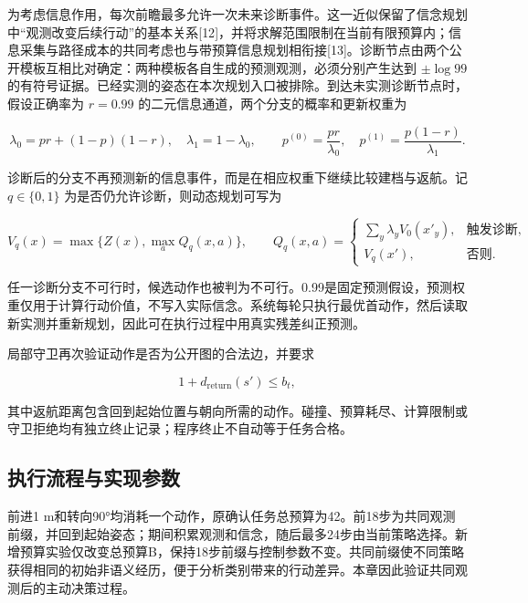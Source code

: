 \documentclass[11pt,a4paper]{article}
\begin{document}
为考虑信息作用，每次前瞻最多允许一次未来诊断事件。这一近似保留了信念规划中``观测改变后续行动''的基本关系{[}12{]}，并将求解范围限制在当前有限预算内；信息采集与路径成本的共同考虑也与带预算信息规划相衔接{[}13{]}。诊断节点由两个公开模板互相比对确定：两种模板各自生成的预测观测，必须分别产生达到 \(\pm\log99\) 的有符号证据。已经实测的姿态在本次规划入口被排除。到达未实测诊断节点时，假设正确率为 \(r=0.99\) 的二元信息通道，两个分支的概率和更新权重为

\[
\lambda_0=pr+(1-p)(1-r),\quad \lambda_1=1-\lambda_0,
\qquad p^{(0)}=\frac{pr}{\lambda_0},\quad
p^{(1)}=\frac{p(1-r)}{\lambda_1}.
\]

诊断后的分支不再预测新的信息事件，而是在相应权重下继续比较建档与返航。记 \(q\in\{0,1\}\) 为是否仍允许诊断，则动态规划可写为

\[
V_q(x)=\max\{Z(x),\max_a Q_q(x,a)\},\qquad
Q_q(x,a)=
\begin{cases}
\sum_y\lambda_yV_0(x'_{y}),&\text{触发诊断},\\
V_q(x'),&\text{否则}.
\end{cases}
\]

任一诊断分支不可行时，候选动作也被判为不可行。0.99是固定预测假设，预测权重仅用于计算行动价值，不写入实际信念。系统每轮只执行最优首动作，然后读取新实测并重新规划，因此可在执行过程中用真实残差纠正预测。

局部守卫再次验证动作是否为公开图的合法边，并要求

\[
1+d_{\mathrm{return}}(s')\le b_t,
\]

其中返航距离包含回到起始位置与朝向所需的动作。碰撞、预算耗尽、计算限制或守卫拒绝均有独立终止记录；程序终止不自动等于任务合格。

\hypertarget{ux6267ux884cux6d41ux7a0bux4e0eux5b9eux73b0ux53c2ux6570}{%
\subsection{执行流程与实现参数}\label{ux6267ux884cux6d41ux7a0bux4e0eux5b9eux73b0ux53c2ux6570}}

前进1 m和转向90°均消耗一个动作，原确认任务总预算为42。前18步为共同观测前缀，并回到起始姿态；期间积累观测和信念，随后最多24步由当前策略选择。新增预算实验仅改变总预算B，保持18步前缀与控制参数不变。共同前缀使不同策略获得相同的初始非语义经历，便于分析类别带来的行动差异。本章因此验证共同观测后的主动决策过程。
\end{document}
